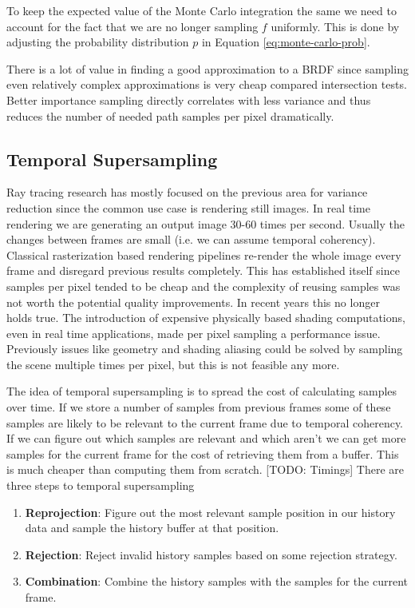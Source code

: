 \documentclass{ACGSeminar}
\begin{document}
To keep the expected value of the Monte Carlo integration the same we need to account for the fact that we are no longer sampling $f$ uniformly. This is done by adjusting the probability distribution $p$ in Equation \eqref{eq:monte-carlo-prob}.

There is a lot of value in finding a good approximation to a BRDF since sampling even relatively complex approximations is very cheap compared intersection tests. Better importance sampling directly correlates with less variance and thus reduces the number of needed path samples per pixel dramatically.



\subsection{Temporal Supersampling}
Ray tracing research has mostly focused on the previous area for variance reduction since the common use case is rendering still images.
In real time rendering we are generating an output image 30-60 times per second. Usually the changes between frames are small (i.e. we can assume temporal coherency). Classical rasterization based rendering pipelines re-render the whole image every frame and disregard previous results completely. This has established itself since samples per pixel tended to be cheap and the complexity of reusing samples was not worth the potential quality improvements.
In recent years this no longer holds true. The introduction of expensive physically based shading computations, even in real time applications, made per pixel sampling a performance issue. Previously issues like geometry and shading aliasing could be solved by sampling the scene multiple times per pixel, but this is not feasible any more.

The idea of temporal supersampling is to spread the cost of calculating samples over time. If we store a number of samples from previous frames some of these samples are likely to be relevant to the current frame due to temporal coherency. If we can figure out which samples are relevant and which aren't we can get more samples for the current frame for the cost of retrieving them from a buffer. This is much cheaper than computing them from scratch. [TODO: Timings]
There are three steps to temporal supersampling
\begin{enumerate}
\item \textbf{Reprojection}: Figure out the most relevant sample position in our history data and sample the history buffer at that position.
\item \textbf{Rejection}: Reject invalid history samples based on some rejection strategy.
\item \textbf{Combination}: Combine the history samples with the samples for the current frame.
\end{enumerate}
\end{document}

